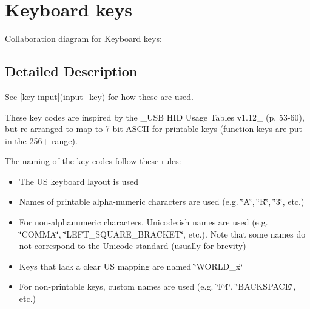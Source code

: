\hypertarget{group__keys}{
\section{Keyboard keys}
\label{group__keys}
}


Collaboration diagram for Keyboard keys:

\subsection{Detailed Description}
See \mbox{[}key input\mbox{]}(input\_\-key) for how these are used.

These key codes are inspired by the \_\-USB HID Usage Tables v1.12\_\- (p. 53-60), but re-arranged to map to 7-bit ASCII for printable keys (function keys are put in the 256+ range).

The naming of the key codes follow these rules:\begin{itemize}
\item The US keyboard layout is used\item Names of printable alpha-numeric characters are used (e.g. \char`\"{}A\char`\"{}, \char`\"{}R\char`\"{}, \char`\"{}3\char`\"{}, etc.)\item For non-alphanumeric characters, Unicode:ish names are used (e.g. \char`\"{}COMMA\char`\"{}, \char`\"{}LEFT\_\-SQUARE\_\-BRACKET\char`\"{}, etc.). Note that some names do not correspond to the Unicode standard (usually for brevity)\item Keys that lack a clear US mapping are named \char`\"{}WORLD\_\-x\char`\"{}\item For non-printable keys, custom names are used (e.g. \char`\"{}F4\char`\"{}, \char`\"{}BACKSPACE\char`\"{}, etc.) \end{itemize}
